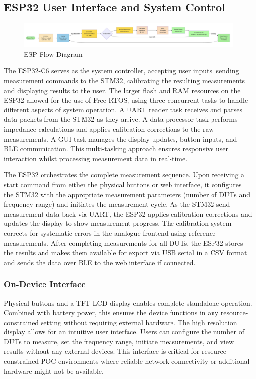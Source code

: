 \subsection{ESP32 User Interface and System Control}
\begin{figure}[H]
    \centering
    \includegraphics[width=\textwidth]{ESPFlowDiagram.png}
    \caption{ESP Flow Diagram}
    \label{fig:esp32_flow}
\end{figure}
The ESP32-C6 serves as the system controller, accepting user inputs, sending measurement commands to the STM32, calibrating the resulting measurements and displaying results to the user. The larger flash and RAM resources on the ESP32 allowed for the use of Free RTOS, using three concurrent tasks to handle different aspects of system operation. A UART reader task receives and parses data packets from the STM32 as they arrive. A data processor task performs impedance calculations and applies calibration corrections to the raw measurements. A GUI task manages the display updates, button inputs, and \ac{BLE} communication. This multi-tasking approach ensures responsive user interaction whilst processing measurement data in real-time.

The ESP32 orchestrates the complete measurement sequence. Upon receiving a start command from either the physical buttons or web interface, it configures the STM32 with the appropriate measurement parameters (number of \acp{DUT} and frequency range) and initiates the measurement cycle. As the STM32 send measurement data back via UART, the ESP32 applies calibration corrections and updates the display to show measurement progress. The calibration system corrects for systematic errors in the analogue frontend using reference measurements. After completing measurements for all \acp{DUT}, the ESP32 stores the results and makes them available for export via USB serial in a CSV format and sends the data over \ac{BLE} to the web interface if connected.

\subsubsection{On-Device Interface}
Physical buttons and a TFT LCD display enables complete standalone operation. Combined with battery power, this ensures the device functions in any resource-constrained setting without requiring external hardware. The high resolution display allows for an intuitive user interface. Users can configure the number of \acp{DUT} to measure, set the frequency range, initiate measurements, and view results without any external devices. This interface is critical for resource constrained \ac{POC} environments where reliable network connectivity or additional hardware might not be available.

